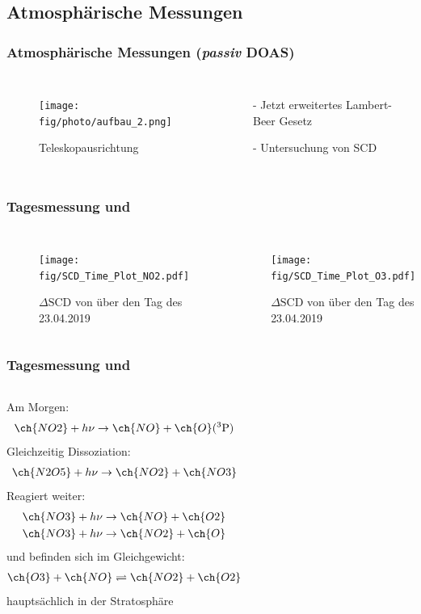 \documentclass{beamer}
\begin{document}
\begin{frame}
    \section{Atmosphärische Messungen}
    \frametitle{Atmosphärische Messungen (\textit{passiv} DOAS)}
    \begin{columns}
    	\begin{figure}[h]
    		\texttt{[image: fig/photo/aufbau\_2.png]}
    		\caption{Teleskopausrichtung}
    	\end{figure}
    	\begin{itemize}
    		\item[-] Jetzt erweitertes Lambert-Beer Gesetz
    		\item[-] Untersuchung von SCD
    	\end{itemize}
    \end{columns}
\end{frame}

\begin{frame}
    \frametitle{Tagesmessung  und }
	\begin{columns}
	  	\begin{figure}
	  		\texttt{[image: fig/SCD\_Time\_Plot\_NO2.pdf]}
    		\caption{$\Delta \text{SCD}$ von  über den Tag des 23.04.2019}
    		\label{fig:delta_SCD_time_NO2}
        \end{figure}
    	\begin{figure}
    		\texttt{[image: fig/SCD\_Time\_Plot\_O3.pdf]}
    		\caption{$\Delta \text{SCD}$ von  über den Tag des 23.04.2019}
    		\label{fig:delta_SCD_time_O3}
    	\end{figure}  		
    \end{columns}
\end{frame}

\begin{frame}
    \frametitle{Tagesmessung  und }
    \begin{columns}
    	Am Morgen:
    	\begin{align}
    		\ch{NO2} + h \nu \to \ch{NO} + \ch{O}(^3\text{P})
    	\end{align}
    \pause
    	Gleichzeitig Dissoziation:
    	\begin{align}
    		\ch{N2O5} + h \nu \to \ch{NO2} + \ch{NO3}
    	\end{align}
    \pause
    	Reagiert weiter:
    	\begin{align}
    		\ch{NO3} + h \nu \to \ch{NO} + \ch{O2}\\
    		\ch{NO3} + h \nu \to \ch{NO2} + \ch{O}
    	\end{align}
    \pause	
      	 und  befinden sich im Gleichgewicht:
      		\begin{align}
      			\ch{O3} + \ch{NO} \rightleftharpoons \ch{NO2} + \ch{O2}
      		\end{align}
      	 hauptsächlich in der Stratosphäre	
    \end{columns}
\end{frame}
\end{document}

